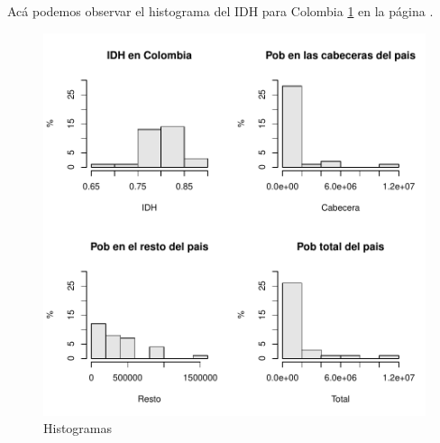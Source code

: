 \documentclass{article}
\begin{document}
Ac\'a podemos observar el histograma del IDH para Colombia \ref{histogramas} en la p\'agina \pageref{histogramas}. 

\begin{figure}[h]
\centering
\begin{adjustbox}{width=12cm,height=7cm,clip,trim=0cm 0.0cm 0cm 0cm}
\includegraphics{Proyecto_final-HistogramaIDHPlot}
\end{adjustbox}
\caption{Histogramas}
\label{histogramas}
\end{figure}
\end{document}
